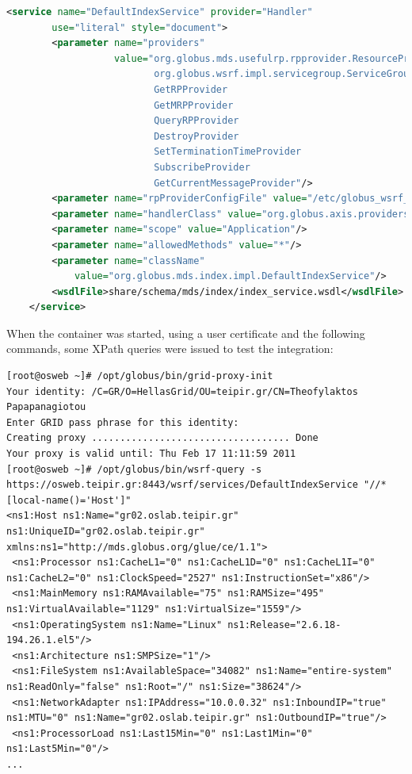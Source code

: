 \begin{lstlisting}[language=XML,caption=Web Service Deployment Descriptor for WSRF Index,label=wsrfwsdd]
    <service name="DefaultIndexService" provider="Handler"
        use="literal" style="document">
        <parameter name="providers"
                   value="org.globus.mds.usefulrp.rpprovider.ResourcePropertyProviderCollection
                          org.globus.wsrf.impl.servicegroup.ServiceGroupRegistrationProvider
                          GetRPProvider
                          GetMRPProvider
                          QueryRPProvider
                          DestroyProvider
                          SetTerminationTimeProvider
                          SubscribeProvider
                          GetCurrentMessageProvider"/>
        <parameter name="rpProviderConfigFile" value="/etc/globus_wsrf_mds_index/rpprovider-config-gluece.xml"/>
        <parameter name="handlerClass" value="org.globus.axis.providers.RPCProvider"/>
        <parameter name="scope" value="Application"/>
        <parameter name="allowedMethods" value="*"/>
        <parameter name="className"
            value="org.globus.mds.index.impl.DefaultIndexService"/>
        <wsdlFile>share/schema/mds/index/index_service.wsdl</wsdlFile>
    </service>
\end{lstlisting}

When the container was started, using a user certificate and the following commands, some XPath queries were issued to test the integration:
 
\begin{lstlisting}[caption=WSRF command line query]
[root@osweb ~]# /opt/globus/bin/grid-proxy-init
Your identity: /C=GR/O=HellasGrid/OU=teipir.gr/CN=Theofylaktos Papapanagiotou
Enter GRID pass phrase for this identity:
Creating proxy ................................... Done
Your proxy is valid until: Thu Feb 17 11:11:59 2011
[root@osweb ~]# /opt/globus/bin/wsrf-query -s https://osweb.teipir.gr:8443/wsrf/services/DefaultIndexService "//*[local-name()='Host']"
<ns1:Host ns1:Name="gr02.oslab.teipir.gr" ns1:UniqueID="gr02.oslab.teipir.gr" xmlns:ns1="http://mds.globus.org/glue/ce/1.1">
 <ns1:Processor ns1:CacheL1="0" ns1:CacheL1D="0" ns1:CacheL1I="0" ns1:CacheL2="0" ns1:ClockSpeed="2527" ns1:InstructionSet="x86"/>
 <ns1:MainMemory ns1:RAMAvailable="75" ns1:RAMSize="495" ns1:VirtualAvailable="1129" ns1:VirtualSize="1559"/>
 <ns1:OperatingSystem ns1:Name="Linux" ns1:Release="2.6.18-194.26.1.el5"/>
 <ns1:Architecture ns1:SMPSize="1"/>
 <ns1:FileSystem ns1:AvailableSpace="34082" ns1:Name="entire-system" ns1:ReadOnly="false" ns1:Root="/" ns1:Size="38624"/>
 <ns1:NetworkAdapter ns1:IPAddress="10.0.0.32" ns1:InboundIP="true" ns1:MTU="0" ns1:Name="gr02.oslab.teipir.gr" ns1:OutboundIP="true"/>
 <ns1:ProcessorLoad ns1:Last15Min="0" ns1:Last1Min="0" ns1:Last5Min="0"/>
...
\end{lstlisting}

